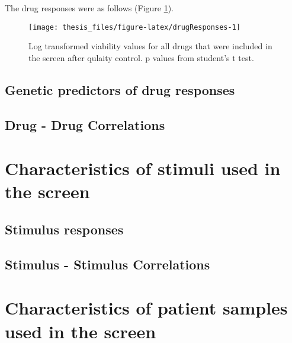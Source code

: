 \documentclass[11pt, a4paper, twosided]{book}
\begin{document}
The drug responses were as follows (Figure \ref{fig:drugResponses}).


\begin{figure}

{\centering \texttt{[image: thesis\_files/figure-latex/drugResponses-1]} 

}

\caption{Log transformed viability values for all drugs that were included in the screen after qulaity control. p values from student's t test.}\label{fig:drugResponses}
\end{figure}
\hypertarget{genetic-predictors-of-drug-responses}{%
\subsection{Genetic predictors of drug responses}\label{genetic-predictors-of-drug-responses}}

\hypertarget{drug---drug-correlations}{%
\subsection{Drug - Drug Correlations}\label{drug---drug-correlations}}

\hypertarget{characteristics-of-stimuli-used-in-the-screen}{%
\section{Characteristics of stimuli used in the screen}\label{characteristics-of-stimuli-used-in-the-screen}}

\hypertarget{stimulus-responses}{%
\subsection{Stimulus responses}\label{stimulus-responses}}

\hypertarget{stimulus---stimulus-correlations}{%
\subsection{Stimulus - Stimulus Correlations}\label{stimulus---stimulus-correlations}}

\hypertarget{characteristics-of-patient-samples-used-in-the-screen}{%
\section{Characteristics of patient samples used in the screen}\label{characteristics-of-patient-samples-used-in-the-screen}}
\end{document}
